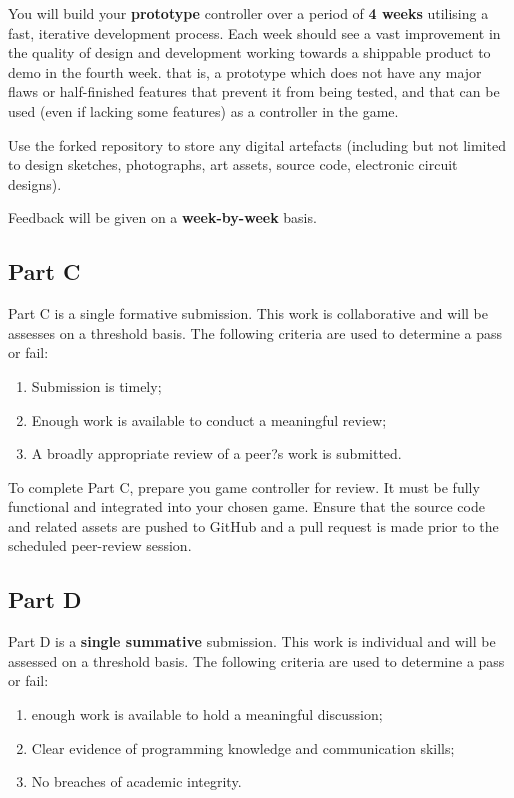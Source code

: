 \documentclass{../fal_assignment}
\begin{document}
You will build your \textbf{prototype} controller over a period of \textbf{4 weeks} utilising a fast, iterative development process. Each week should see a vast improvement in the quality of design and development working towards a shippable product to demo in the fourth week. that is, a prototype which does not have any major flaws or half-finished features that prevent it from being tested, and that can be used (even if lacking some features) as a controller in the game. 

Use the forked repository to store any digital artefacts (including but not limited to design sketches, photographs, art assets, source code, electronic circuit designs). 

Feedback will be given on a \textbf{week-by-week} basis. 

\subsection*{Part C}

Part C is a single formative submission. This work is collaborative and will be assesses on a threshold basis. The following criteria are used to determine a pass or fail:
\begin{enumerate}[label=(\alph*)]
	\item Submission is timely;
	\item Enough work is available to conduct a meaningful review;
	\item A broadly appropriate review of a peer?s work is submitted.
\end{enumerate}

To complete Part C, prepare you game controller for review. It must be fully functional and integrated into your chosen game.  Ensure that the source code and related assets are pushed to GitHub and a pull request is made prior to the scheduled peer-review session.

\subsection*{Part D}

Part D is a \textbf{single summative} submission. This work is individual and will be assessed on a threshold basis. The following criteria are used to determine a pass or fail: 

\begin{enumerate}[label=(\alph*)]
	\item enough work is available to hold a meaningful discussion; 
	\item Clear evidence of programming knowledge and communication skills; 
	\item No breaches of academic integrity. 
\end{enumerate}
\end{document}
